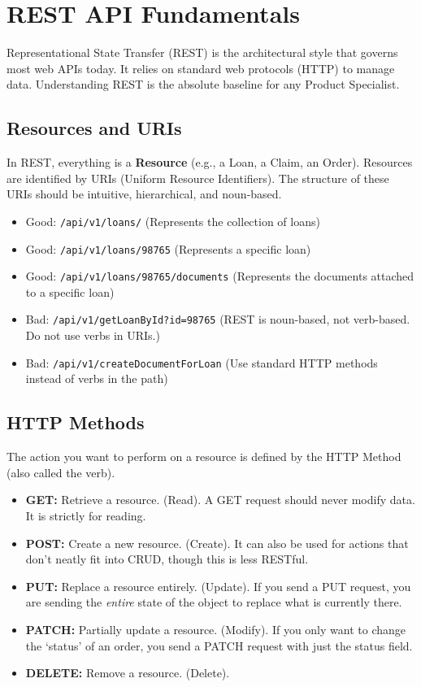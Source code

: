 \section{REST API Fundamentals}\label{rest-api-fundamentals}

Representational State Transfer (REST) is the architectural style that
governs most web APIs today. It relies on standard web protocols (HTTP)
to manage data. Understanding REST is the absolute baseline for any
Product Specialist.

\subsection{Resources and URIs}\label{resources-and-uris}

In REST, everything is a \textbf{Resource} (e.g., a Loan, a Claim, an
Order). Resources are identified by URIs (Uniform Resource Identifiers).
The structure of these URIs should be intuitive, hierarchical, and
noun-based.

\begin{itemize}
\tightlist
\item
  Good: \texttt{/api/v1/loans/} (Represents the collection of loans)
\item
  Good: \texttt{/api/v1/loans/98765} (Represents a specific loan)
\item
  Good: \texttt{/api/v1/loans/98765/documents} (Represents the documents
  attached to a specific loan)
\item
  Bad: \texttt{/api/v1/getLoanById?id=98765} (REST is noun-based, not
  verb-based. Do not use verbs in URIs.)
\item
  Bad: \texttt{/api/v1/createDocumentForLoan} (Use standard HTTP methods
  instead of verbs in the path)
\end{itemize}

\subsection{HTTP Methods}\label{http-methods}

The action you want to perform on a resource is defined by the HTTP
Method (also called the verb).

\begin{itemize}
\tightlist
\item
  \textbf{GET:} Retrieve a resource. (Read). A GET request should never
  modify data. It is strictly for reading.
\item
  \textbf{POST:} Create a new resource. (Create). It can also be used
  for actions that don't neatly fit into CRUD, though this is less
  RESTful.
\item
  \textbf{PUT:} Replace a resource entirely. (Update). If you send a PUT
  request, you are sending the \emph{entire} state of the object to
  replace what is currently there.
\item
  \textbf{PATCH:} Partially update a resource. (Modify). If you only
  want to change the `status' of an order, you send a PATCH request with
  just the status field.
\item
  \textbf{DELETE:} Remove a resource. (Delete).
\end{itemize}

